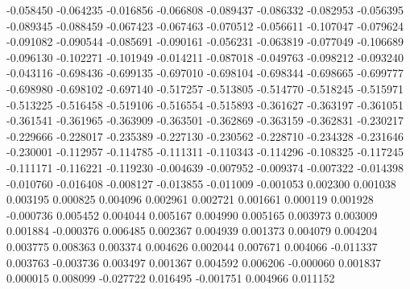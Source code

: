 -0.058450
-0.064235
-0.016856
-0.066808
-0.089437
-0.086332
-0.082953
-0.056395
-0.089345
-0.088459
-0.067423
-0.067463
-0.070512
-0.056611
-0.107047
-0.079624
-0.091082
-0.090544
-0.085691
-0.090161
-0.056231
-0.063819
-0.077049
-0.106689
-0.096130
-0.102271
-0.101949
-0.014211
-0.087018
-0.049763
-0.098212
-0.093240
-0.043116
-0.698436
-0.699135
-0.697010
-0.698104
-0.698344
-0.698665
-0.699777
-0.698980
-0.698102
-0.697140
-0.517257
-0.513805
-0.514770
-0.518245
-0.515971
-0.513225
-0.516458
-0.519106
-0.516554
-0.515893
-0.361627
-0.363197
-0.361051
-0.361541
-0.361965
-0.363909
-0.363501
-0.362869
-0.363159
-0.362831
-0.230217
-0.229666
-0.228017
-0.235389
-0.227130
-0.230562
-0.228710
-0.234328
-0.231646
-0.230001
-0.112957
-0.114785
-0.111311
-0.110343
-0.114296
-0.108325
-0.117245
-0.111171
-0.116221
-0.119230
-0.004639
-0.007952
-0.009374
-0.007322
-0.014398
-0.010760
-0.016408
-0.008127
-0.013855
-0.011009
-0.001053
0.002300
0.001038
0.003195
0.000825
0.004096
0.002961
0.002721
0.001661
0.000119
0.001928
-0.000736
0.005452
0.004044
0.005167
0.004990
0.005165
0.003973
0.003009
0.001884
-0.000376
0.006485
0.002367
0.004939
0.001373
0.004079
0.004204
0.003775
0.008363
0.003374
0.004626
0.002044
0.007671
0.004066
-0.011337
0.003763
-0.003736
0.003497
0.001367
0.004592
0.006206
-0.000060
0.001837
0.000015
0.008099
-0.027722
0.016495
-0.001751
0.004966
0.011152
